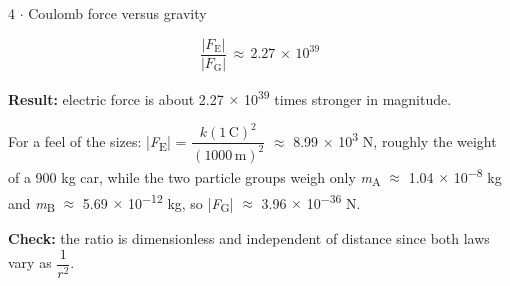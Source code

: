 \documentclass[11pt]{article}
\begin{document}
\begin{keepsection}
\begin{workedbox}{4 \ensuremath{\cdot} Coulomb force versus gravity}
\begin{enumerate}
\begin{equation*}\dfrac{|{F}_{\mathrm{E}}|}{|{F}_{\mathrm{G}}|}\, \approx \, 2.27\, \times \, 10^{39}\end{equation*}

\textbf{Result:} electric force is about 2.27 \ensuremath{\times} 10\textsuperscript{39} times stronger in magnitude.

For a feel of the sizes: |\textit{F}\textsubscript{E}| = {\small\ensuremath{\dfrac{{k}(1\, \mathrm{C})^{2}}{(1000\, \mathrm{m})^{2}}}} \ensuremath{\approx} 8.99 \ensuremath{\times} 10\textsuperscript{3} N, roughly the weight of a 900 kg car, while the two particle groups weigh only \textit{m}\textsubscript{A} \ensuremath{\approx} 1.04 \ensuremath{\times} 10\textsuperscript{\ensuremath{-}8} kg and \textit{m}\textsubscript{B} \ensuremath{\approx} 5.69 \ensuremath{\times} 10\textsuperscript{\ensuremath{-}12} kg, so |\textit{F}\textsubscript{G}| \ensuremath{\approx} 3.96 \ensuremath{\times} 10\textsuperscript{\ensuremath{-}36} N.

\textbf{Check:} the ratio is dimensionless and independent of distance since both laws vary as {\small\ensuremath{\dfrac{1}{{r}^{2}}}}.
\end{enumerate}
\end{workedbox}

\end{keepsection}
\end{document}
